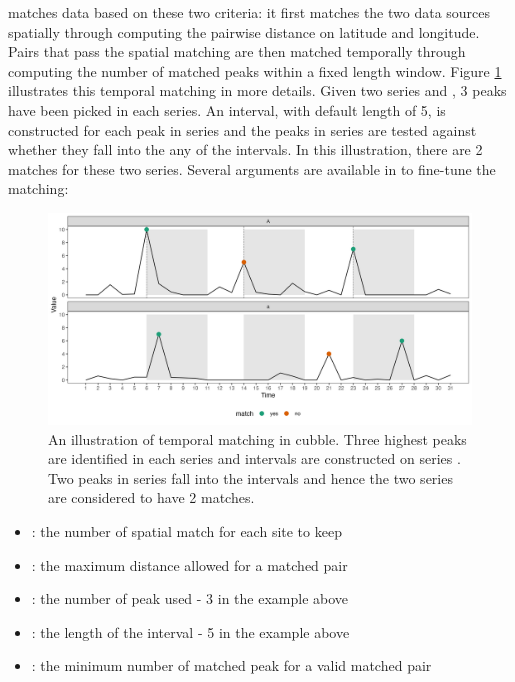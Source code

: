 \documentclass[
]{jss}
\providecommand{\tightlist}{%
  \setlength{\itemsep}{0pt}\setlength{\parskip}{0pt}}
\begin{document}
 matches data based on these two criteria: it first
matches the two data sources spatially through computing the pairwise
distance on latitude and longitude. Pairs that pass the spatial matching
are then matched temporally through computing the number of matched
peaks within a fixed length window. Figure \ref{fig:illu-matching}
illustrates this temporal matching in more details. Given two series
 and , 3 peaks have been picked in each series. An
interval, with default length of 5, is constructed for each peak in
series  and the peaks in series  are tested against
whether they fall into the any of the intervals. In this illustration,
there are 2 matches for these two series. Several arguments are
available in  to fine-tune the matching:

\begin{CodeChunk}
\begin{figure}

{\centering \includegraphics[width=1\linewidth]{figures/illu-matching} 

}

\caption{An illustration of temporal matching in cubble. Three highest peaks are identified in each series and intervals are constructed on series . Two peaks in series  fall into the intervals and hence the two series are considered to have 2 matches.}\label{fig:illu-matching}
\end{figure}
\end{CodeChunk}

\begin{itemize}
\tightlist
\item
  : the number of spatial match for each site to
  keep
\item
  : the maximum distance allowed for a matched
  pair
\item
  : the number of peak used - 3 in the example
  above
\item
  : the length of the interval - 5 in the example
  above
\item
  : the minimum number of matched peak for a
  valid matched pair
\end{itemize}
\end{document}
